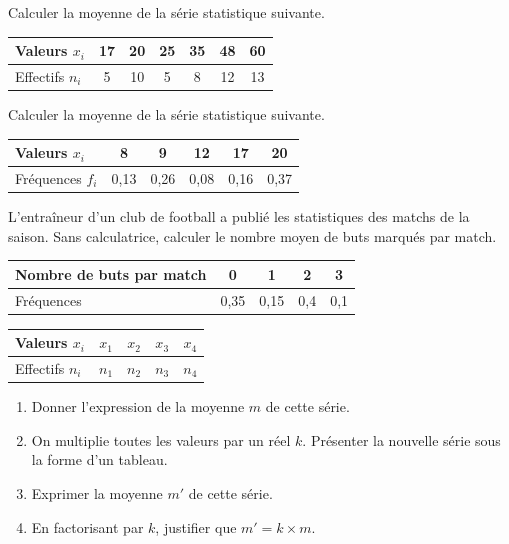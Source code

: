 \exo

Calculer la moyenne de la série statistique suivante.

   \begin{tabular}{| l | c | c | c | c | c | c |}
     \hline
     Valeurs $x_i$ & 17 & 20 & 25 & 35 & 48 & 60 \\ \hline
     Effectifs $n_i$ & 5 & 10 & 5 & 8 & 12 & 13 \\ 
     \hline
   \end{tabular}
\exo

Calculer la moyenne de la série statistique suivante.

   \begin{tabular}{| l | c | c | c | c | c |}
     \hline
     Valeurs $x_i$ & 8 & 9 & 12 & 17 & 20 \\ \hline
     Fréquences $f_i$ & 0,13 & 0,26 & 0,08 & 0,16 & 0,37 \\ 
     \hline
    \end{tabular}
    
\exo
L'entraîneur d'un club de football a publié les statistiques des matchs de la saison.
Sans calculatrice, calculer le nombre moyen de buts marqués par match.

   \begin{tabular}{| l | c | c | c | c |}
     \hline
     Nombre de buts par match & 0 & 1 & 2 & 3 \\ \hline
     Fréquences & 0,35 & 0,15 & 0,4 & 0,1\\ 
     \hline
    \end{tabular}

\exo

 \begin{tabular}{| l | c | c | c | c |}
     \hline
     Valeurs $x_i$ & $x_1$ & $x_2$ & $x_3$ & $x_4$ \\ \hline
     Effectifs $n_i$ & $n_1$ & $n_2$ & $n_3$ & $n_4$ \\ 
     \hline
    \end{tabular}

\begin{enumerate}
\item Donner l'expression de la moyenne $m$ de cette série.
\item On multiplie toutes les valeurs par un réel $k$. Présenter la nouvelle série sous la forme d'un tableau.
\item Exprimer la moyenne $m'$ de cette série.
\item En factorisant par $k$, justifier que $m'=k\times m$.
\end{enumerate}

